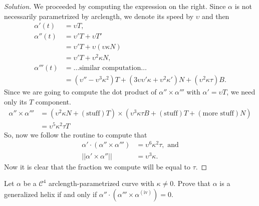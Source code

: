 \documentclass[Shifrin_Solutions_Spring_2015]{subfiles}
\begin{document}
\begin{proof}[Solution]
We proceeded by computing the expression on the right. Since $\alpha$ is not necessarily parametrized by arclength, we denote its speed by $\upsilon$ and then
\begin{align*}
\alpha'(t) & = \upsilon T ,\\
\alpha''(t) & = \upsilon' T + \upsilon T' \\
	& = \upsilon' T + \upsilon( \upsilon \kappa N) \\
	& = \upsilon' T + \upsilon^2 \kappa N ,\\
\alpha'''(t) & = \dots \text{similar computation}\dots \\
	& = ( \upsilon''  - \upsilon^3\kappa^2  )T + ( 3\upsilon \upsilon' \kappa + \upsilon^2\kappa' ) N + (\upsilon^2 \kappa\tau ) B .
\end{align*}
Since we are going to compute the dot product of $\alpha'' \times \alpha'''$ with $\alpha' = \upsilon T$, we need only its $T$ component.
\[
\begin{split}
\alpha''\times \alpha''' & = (\upsilon^2 \kappa N + (\text{stuff}) T) \times ( \upsilon^3 \kappa \tau B + (\text{stuff}) T + (\text{more stuff}) N )\\
 & = \upsilon^5 \kappa^2 \tau T
\end{split}
\]
So, now we follow the routine to compute that
\begin{align*}
\alpha' \cdot ( \alpha''\times \alpha''') & = \upsilon^6 \kappa^2 \tau , \text{ and}\\
||\alpha' \times \alpha''|| & = \upsilon^3 \kappa .
\end{align*}
Now it is clear that the fraction we compute will be equal to $\tau$.
\end{proof}

\vspace{.5cm}


\begin{exercise}
Let $\alpha$ be a $\mathcal{C}^4$ arclength-parametrized curve with $\kappa \neq 0$. Prove that $\alpha$ is a generalized helix if and only if $\alpha''\cdot(\alpha'''\times\alpha^{(\mathrm{iv})}) = 0$.
\end{exercise}
\end{document}
